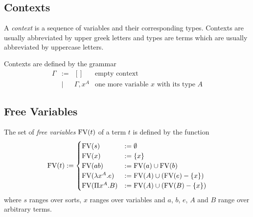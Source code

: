 \subsection{Contexts}


\begin{definition}
    A \emph{context} is a sequence of variables and their corresponding types.
    Contexts are usually abbreviated by upper greek letters and types are terms
    which are usually abbreviated by uppercase letters.

    Contexts are defined by the grammar
    $$
    \begin{array}{llll}
        \Gamma
        &:=& [] & \text{empty context}

        \\

        &\mid& \Gamma, x^A & \text{one more variable $x$ with its type $A$}
    \end{array}
    $$
\end{definition}







\subsection{Free Variables}

\begin{definition}
    The set of \emph{free variables} $\FV(t)$ of a term $t$ is defined by the
    function
    $$
    \FV(t) :=
        \begin{cases}
            \FV(s) &:= \emptyset

            \\

            \FV(x) &:= \{ x \}

            \\

            \FV(a b) &:= \FV(a) \cup \FV(b)

            \\

            \FV(\lambda x^A. e) &:= \FV(A) \cup (\FV(e) - \{x\})

            \\

            \FV(\Pi x^A. B) &:= \FV(A) \cup (\FV(B) - \{x\})
        \end{cases}
    $$
    where $s$ ranges over sorts, $x$ ranges over variables and $a$, $b$,
    $e$, $A$ and $B$ range over arbitrary terms.
\end{definition}

